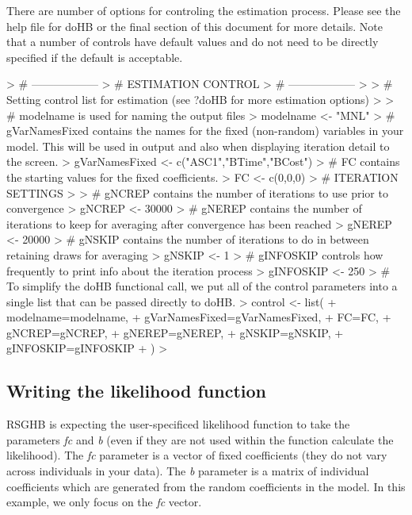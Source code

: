 \documentclass{article}
\begin{document}
There are number of options for controling the estimation process. Please see the help file for doHB or the final section of this document for more details. Note that a number of controls have default values and do not need to be directly specified if the default is acceptable.

\begin{Schunk}
\begin{Sinput}
> # ------------------
> # ESTIMATION CONTROL
> # ------------------
> 
> # Setting control list for estimation (see ?doHB for more estimation options)
> 
> # modelname is used for naming the output files
> modelname <- "MNL"          
> # gVarNamesFixed contains the names for the fixed (non-random) variables in your model. This will be used in output and also when displaying iteration detail to the screen.
> gVarNamesFixed <- c("ASC1","BTime","BCost")
> # FC contains the starting values for the fixed coefficients.
> FC <- c(0,0,0)                 
> # ITERATION SETTINGS
> 
> # gNCREP contains the number of iterations to use prior to convergence
> gNCREP    <- 30000
> # gNEREP contains the number of iterations to keep for averaging after convergence has been reached
> gNEREP    <- 20000 	       
> # gNSKIP contains the number of iterations to do in between retaining draws for averaging
> gNSKIP    <- 1		       
> # gINFOSKIP controls how frequently to print info about the iteration process
> gINFOSKIP <- 250           
> # To simplify the doHB functional call, we put all of the control parameters into a single list that can be passed directly to doHB.
> control <- list(
+      modelname=modelname,
+      gVarNamesFixed=gVarNamesFixed,
+      FC=FC,
+      gNCREP=gNCREP,
+      gNEREP=gNEREP,
+      gNSKIP=gNSKIP,
+      gINFOSKIP=gINFOSKIP
+ )
> 
\end{Sinput}
\end{Schunk}

\subsection*{Writing the likelihood function}

RSGHB is expecting the user-specificed likelihood function to take the parameters \emph{fc} and \emph{b} (even if they are not used within the function calculate the likelihood). The \emph{fc} parameter is a vector of fixed coefficients (they do not vary across individuals in your data). The \emph{b} parameter is a matrix of individual coefficients which are generated from the random coefficients in the model. In this example, we only focus on the \emph{fc} vector.
\end{document}
